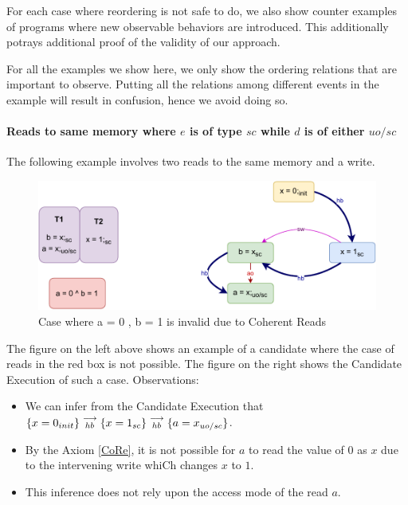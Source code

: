 
    For each case where reordering is not safe to do, we also show counter examples of programs where new observable behaviors are introduced.
    This additionally potrays additional proof of the validity of our approach. 

    For all the examples we show here, we only show the ordering relations that are important to observe. 
    Putting all the relations among different events in the example will result in confusion, hence we avoid doing so. 

    \paragraph{Reads to same memory where $e$ is of type $sc$ while $d$ is of either $uo/sc$}
        
        The following example involves two reads to the same memory and a write. 
        
        \begin{figure}[H]
            \centering
            \includegraphics[scale=0.7]{5.InstructionReordering/4.ValidReorderingCandidate/Example1(Rsc-Ruo,sc).pdf}
            \caption{Case where a = 0 , b = 1 is invalid due to Coherent Reads}
        \end{figure}

        The figure on the left above shows an example of a candidate where the case of reads in the red box is not possible. 
        The figure on the right shows the Candidate Execution of such a case. 
        Observations:
        \begin{itemize}
            \item We can infer from the Candidate Execution that $\{x=0_{init}\}\stackrel{\longrightarrow}{_{hb}}\{x=1_{sc}\}\stackrel{\longrightarrow}{_{hb}}\{a=x_{uo/sc}\}$.
            \item By the Axiom \ref{CoRe}, it is not possible for $a$ to read the value of $0$ as $x$ due to the intervening write whiCh changes $x$ to $1$.  
            \item This inference does not rely upon the access mode of the read $a$. 
        \end{itemize}
        
